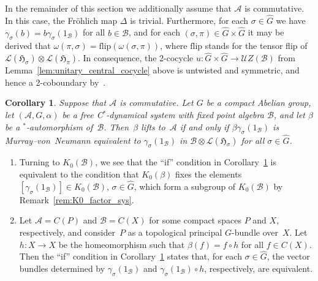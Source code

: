 \documentclass[pdftex]{sigma}
\numberwithin{equation}{section}
\newtheorem{Corollary}[Theorem]{Corollary}
\newcommand*{\tensor}{\otimes}		%
\newcommand*{\Star}{$^*$\nobreakdash}
\newcommand*{\hilb}{\mathfrak}		%
\newcommand*{\alg}{\mathcal}		%
\newcommand*{\hH}{\hilb{H}}			%
\newcommand*{\one}{1}				%
\newcommand*{\aA}{\alg{A}}			%
\newcommand*{\aB}{\alg{B}} 			%
\newcommand*{\End}{\mathcal{L}} %
\newcommand*{\Cont}{C}
\begin{document}
In the remainder of this section we additionally assume that $\aA$ is commutative.
In this case, the Fr\"ohlich map $\Delta$ is trivial.
Furthermore, for each $\sigma \in \hat G$ we have $\gamma_\sigma(b) = b \gamma_\sigma(\one_\aB)$ for all $b \in \aB$, and for each $(\sigma,\pi) \in \hat G \times \hat G$ it may be derived that $\omega(\pi, \sigma) = \text{flip} ( \omega(\sigma,\pi) )$, where $\text{flip}$ stands for the tensor flip of $\End(\hH_\sigma) \tensor \End(\hH_\pi)$.
In consequence, the 2-cocycle $u\colon \hat G \times \hat G \to \mathcal{U}Z(\aB)$ from Lemma~\ref{lem:unitary_central_cocycle} above is untwisted and symmetric, and hence a 2-coboundary by~\cite[Lemma~3.6]{BCER84}.

\begin{Corollary}\label{cor:commAbelian}
	Suppose that $\aA$ is commutative. Let $G$ be a compact Abelian group, let $(\aA, G, \alpha)$ be a free C\Star-dynamical system with fixed point algebra $\aB$, and let $\beta$ be a \Star-automorphism of~$\aB$.
	Then~$\beta$ lifts to~$\aA$ if and only if $\beta\gamma_\sigma(\one_\aB)$ is Murray--von~Neumann equivalent to $\gamma_\sigma(\one_\aB)$ in \mbox{$\aB \tensor \End(\hH_\sigma)$} for all $\sigma \in \hat G$.
\end{Corollary}
\begin{Remark}\quad
	\begin{enumerate}\itemsep=0pt
	\item
		Turning to $K_0(\aB)$, we see that the ``if'' condition in Corollary~\ref{cor:commAbelian} is equivalent to the condition that $K_0(\beta)$ fixes the elements $[\gamma_\sigma(\one_\aB)] \in K_0(\aB)$, $\sigma \in \hat G$, which form a subgroup of $K_0(\aB)$ by Remark~\ref{rem:K0_factor_sys}.
	\item
	Let $\aA = \Cont(P)$ and $\aB = \Cont(X)$ for some compact spaces $P$ and $X$, respectively, and consider~$P$ as a topological principal $G$-bundle over~$X$.
Let $h\colon X \to X$ be the homeomorphism such that $\beta(f) = f \circ h$ for all $f \in \Cont(X)$.
Then the ``if'' condition in Corollary~\ref{cor:commAbelian} states that, for each $\sigma \in \hat G$, the vector bundles determined by $\gamma_\sigma(\one_\aB)$ and $\gamma_\sigma(\one_\aB) \circ h$, respectively, are equivalent.
	\end{enumerate}
\end{Remark}
\end{document}
